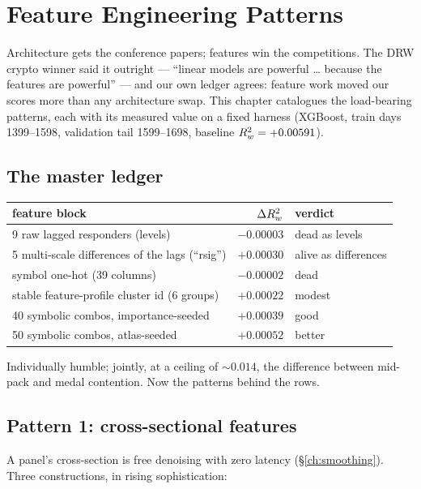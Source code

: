 \chapter{Feature Engineering Patterns}
\label{ch:featurepatterns}

Architecture gets the conference papers; features win the competitions. The
DRW crypto winner said it outright --- ``linear models are powerful \ldots{}
because the features are powerful'' --- and our own ledger agrees: feature
work moved our scores more than any architecture swap. This chapter
catalogues the load-bearing patterns, each with its measured value on a
fixed harness (XGBoost, train days 1399--1598, validation tail 1599--1698,
baseline $R^2_{w} = +0.00591$).

\section{The master ledger}

\begin{center}
\begin{tabular}{@{}lrl@{}}
\toprule
feature block & $\Delta R^2_{w}$ & verdict \\
\midrule
9 raw lagged responders (levels) & $-0.00003$ & dead as levels \\
5 multi-scale differences of the lags (``rsig'') & $+0.00030$ & alive as
differences \\
symbol one-hot (39 columns) & $-0.00002$ & dead \\
stable feature-profile cluster id (6 groups) & $+0.00022$ & modest \\
40 symbolic combos, importance-seeded & $+0.00039$ & good \\
50 symbolic combos, atlas-seeded & $+0.00052$ & better \\
\bottomrule
\end{tabular}
\end{center}

Individually humble; jointly, at a ceiling of $\sim 0.014$, the difference
between mid-pack and medal contention. Now the patterns behind the rows.

\section{Pattern 1: cross-sectional features}

A panel's cross-section is free denoising with zero latency
(\S\ref{ch:smoothing}). Three constructions, in rising sophistication:

